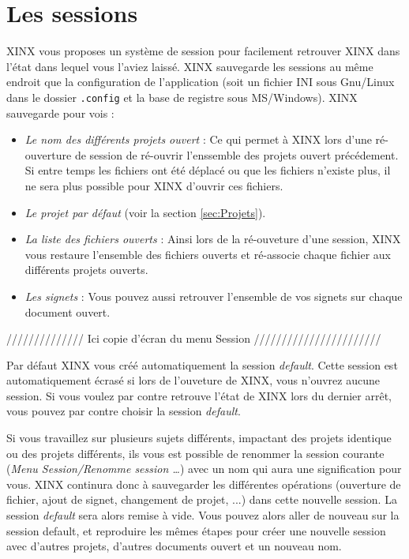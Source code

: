 \documentclass[a4paper,10pt,twoside]{book}
\begin{document}
\section{Les sessions}
\label{sec:Sessions}

XINX vous proposes un système de session pour facilement retrouver XINX dans l'état dans lequel vous l'aviez laissé. XINX sauvegarde les sessions au même endroit que la configuration de l'application (soit un fichier INI sous Gnu/Linux dans le dossier \verb+.config+ et la base de registre sous MS/Windows). XINX sauvegarde pour vois :
\begin{itemize}
 \item \emph{Le nom des différents projets ouvert} : Ce qui permet à XINX lors d'une ré-ouverture de session de ré-ouvrir l'enssemble des projets ouvert précédement. Si entre temps les fichiers ont été déplacé ou que les fichiers n'existe plus, il ne sera plus possible pour XINX d'ouvrir ces fichiers.
 \item \emph{Le projet par défaut} (voir la section \ref{sec:Projets}).
 \item \emph{La liste des fichiers ouverts} : Ainsi lors de la ré-ouveture d'une session, XINX vous restaure l'ensemble des fichiers ouverts et ré-associe chaque fichier aux différents projets ouverts.
 \item \emph{Les signets} : Vous pouvez aussi retrouver l'ensemble de vos signets sur chaque document ouvert.
\end{itemize}

////////////// Ici copie d'écran du menu Session ///////////////////////

Par défaut XINX vous créé automatiquement la session \emph{default}. Cette session est automatiquement écrasé si lors de l'ouveture de XINX, vous n'ouvrez aucune session.  Si vous voulez par contre retrouve l'état de XINX lors du dernier arrêt, vous pouvez par contre choisir la session \emph{default}.

Si vous travaillez sur plusieurs sujets différents, impactant des projets identique ou des projets différents, ils vous est possible de renommer la session courante (\emph{Menu Session/Renomme session \dots}) avec un nom qui aura une signification pour vous. XINX continura donc à sauvegarder les différentes opérations (ouverture de fichier, ajout de signet, changement de projet, ...) dans cette nouvelle session. La session \emph{default} sera alors remise à vide.
Vous pouvez alors aller de nouveau sur la session default, et reproduire les mêmes étapes pour créer une nouvelle session avec d'autres projets, d'autres documents ouvert et un nouveau nom.
\end{document}
